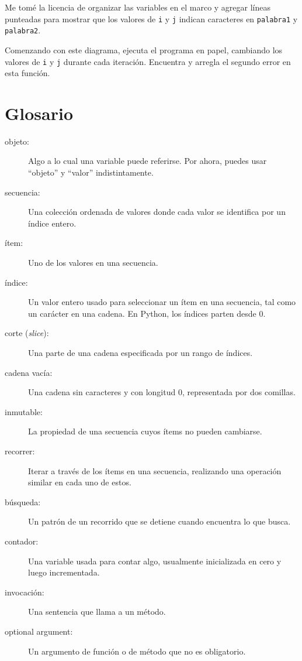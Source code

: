 \documentclass[10pt]{book}
\begin{document}
Me tomé la licencia de organizar las variables en el marco
y agregar líneas punteadas para mostrar que los valores de {\tt i} y
{\tt j} indican caracteres en {\tt palabra1} y {\tt palabra2}.

Comenzando con este diagrama, ejecuta el programa en papel, cambiando los
valores de {\tt i} y {\tt j} durante cada iteración.  Encuentra y arregla el
segundo error en esta función.
\label{isreverse}


\section{Glosario}

\begin{description}

\item[objeto:] Algo a lo cual una variable puede referirse.  Por ahora,
puedes usar ``objeto'' y ``valor'' indistintamente.

\item[secuencia:] Una colección ordenada de
valores donde cada valor se identifica por un índice entero.

\item[ítem:] Uno de los valores en una secuencia.

\item[índice:] Un valor entero usado para seleccionar un ítem en
una secuencia, tal como un carácter en una cadena.  En Python,
los índices parten desde 0.

\item[corte ({\em slice}):] Una parte de una cadena especificada por un rango de índices.

\item[cadena vacía:] Una cadena sin caracteres y con longitud 0, representada
por dos comillas.

\item[inmutable:] La propiedad de una secuencia cuyos ítems no pueden
cambiarse.

\item[recorrer:] Iterar a través de los ítems en una secuencia,
realizando una operación similar en cada uno de estos.

\item[búsqueda:] Un patrón de un recorrido que se detiene
cuando encuentra lo que busca.

\item[contador:] Una variable usada para contar algo, usualmente inicializada
en cero y luego incrementada.

\item[invocación:] Una sentencia que llama a un método.

\item[optional argument:] Un argumento de función o de método que no es
obligatorio.

\end{description}
\end{document}
